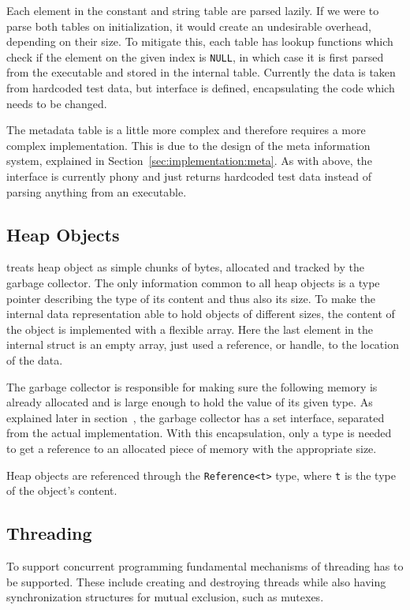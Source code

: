 Each element in the constant and string table are parsed lazily. If we were to
parse both tables on initialization, it would create an undesirable overhead,
depending on their size. To mitigate this, each table has lookup functions which
check if the element on the given index is {\tt NULL}, in which case it is first
parsed from the executable and stored in the internal table. Currently the data
is taken from hardcoded test data, but interface is defined, encapsulating the
code which needs to be changed.

The metadata table is a little more complex and therefore requires a more
complex implementation. This is due to the design of the meta information
system, explained in Section~\ref{sec:implementation:meta}. As with above, the
interface is currently phony and just returns hardcoded test data instead of
parsing anything from an executable.

\subsection{Heap Objects}

\thename{} treats heap object as simple chunks of bytes, allocated and tracked
by the garbage collector. The only information common to all heap objects is a
type pointer describing the type of its content and thus also its size. To make
the internal data representation able to hold objects of different sizes, the
content of the object is implemented with a flexible array. Here the last
element in the internal struct is an empty array, just used a reference, or
handle, to the location of the data.

The garbage collector is responsible for making sure the following memory is
already allocated and is large enough to hold the value of its given type. As
explained later in section~\cite{sec:separate-components:gc}, the garbage
collector has a set interface, separated from the actual implementation. With
this encapsulation, only a type is needed to get a reference to an allocated
piece of memory with the appropriate size.

Heap objects are referenced through the {\tt Reference<t>} type, where {\tt t}
is the type of the object's content.

\subsection{Threading}

To support concurrent programming fundamental mechanisms of threading has to be
supported. These include creating and destroying threads while also having
synchronization structures for mutual exclusion, such as mutexes.

